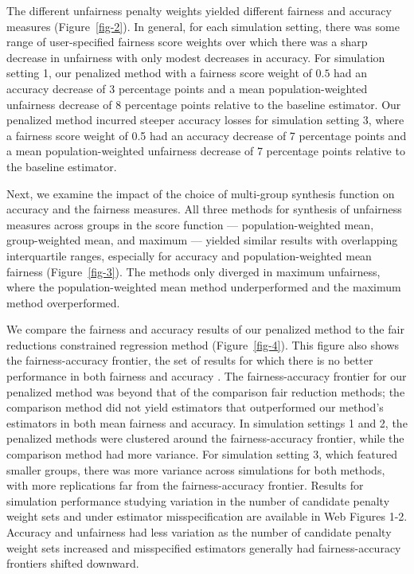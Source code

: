\documentclass[
  12pt]{article}
\begin{document}
The different unfairness penalty weights yielded different fairness and
accuracy measures (Figure~\ref{fig-2}). In general, for each simulation
setting, there was some range of user-specified fairness score weights
over which there was a sharp decrease in unfairness with only modest
decreases in accuracy. For simulation setting 1, our penalized method
with a fairness score weight of \(0.5\) had an accuracy decrease of 3
percentage points and a mean population-weighted unfairness decrease of
8 percentage points relative to the baseline estimator. Our penalized
method incurred steeper accuracy losses for simulation setting 3, where
a fairness score weight of 0.5 had an accuracy decrease of 7 percentage
points and a mean population-weighted unfairness decrease of 7
percentage points relative to the baseline estimator.

Next, we examine the impact of the choice of multi-group synthesis
function on accuracy and the fairness measures. All three methods for
synthesis of unfairness measures across groups in the score function ---
population-weighted mean, group-weighted mean, and maximum --- yielded
similar results with overlapping interquartile ranges, especially for
accuracy and population-weighted mean fairness (Figure~\ref{fig-3}). The
methods only diverged in maximum unfairness, where the
population-weighted mean method underperformed and the maximum method
overperformed.

We compare the fairness and accuracy results of our penalized method to
the fair reductions constrained regression method (Figure~\ref{fig-4}).
This figure also shows the fairness-accuracy frontier, the set of
results for which there is no better performance in both fairness and
accuracy \citep{liang_algorithmic_2023}. The fairness-accuracy frontier
for our penalized method was beyond that of the comparison fair
reduction methods; the comparison method did not yield estimators that
outperformed our method's estimators in both mean fairness and accuracy.
In simulation settings 1 and 2, the penalized methods were clustered
around the fairness-accuracy frontier, while the comparison method had
more variance. For simulation setting 3, which featured smaller groups,
there was more variance across simulations for both methods, with more
replications far from the fairness-accuracy frontier. Results for
simulation performance studying variation in the number of candidate
penalty weight sets and under estimator misspecification are available
in Web Figures 1-2. Accuracy and unfairness had less variation as the
number of candidate penalty weight sets increased and misspecified
estimators generally had fairness-accuracy frontiers shifted downward.
\end{document}
